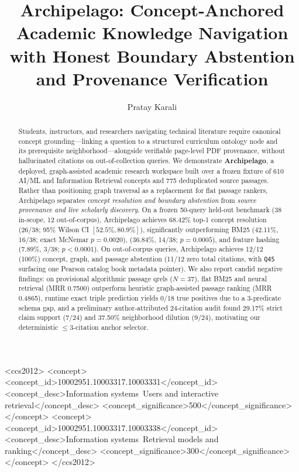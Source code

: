 \documentclass[sigconf]{acmart}
\begin{document}
\title{Archipelago: Concept-Anchored Academic Knowledge Navigation with Honest Boundary Abstention and Provenance Verification}

\author{Pratay Karali}

\begin{abstract}
Students, instructors, and researchers navigating technical literature require
canonical concept grounding---linking a question to a structured curriculum ontology
node and its prerequisite neighborhood---alongside verifiable page-level PDF
provenance, without hallucinated citations on out-of-collection queries. We
demonstrate \textbf{Archipelago}, a deployed, graph-assisted academic research
workspace built over a frozen fixture of 610 AI/ML and Information Retrieval concepts
and 775 deduplicated source passages. Rather than positioning graph traversal as a
replacement for flat passage rankers, Archipelago separates \emph{concept resolution
and boundary abstention} from \emph{source provenance and live scholarly discovery}.
On a frozen 50-query held-out benchmark (38 in-scope, 12 out-of-corpus), Archipelago
achieves 68.42\% top-1 concept resolution (26/38; 95\% Wilson CI $[52.5\%, 80.9\%]$),
significantly outperforming BM25 (42.11\%, 16/38; exact McNemar $p=0.0020$),
 (36.84\%, 14/38; $p=0.0005$), and feature hashing
(7.89\%, 3/38; $p<0.0001$). On out-of-corpus queries, Archipelago achieves 12/12
(100\%) concept, graph, and passage abstention (11/12 zero total citations, with
\texttt{Q45} surfacing one Pearson catalog book metadata pointer). We also report
candid negative findings: on provisional algorithmic passage qrels ($N=37$), flat
BM25 and neural retrieval (MRR 0.7500) outperform heuristic graph-assisted passage
ranking (MRR 0.4865), runtime exact triple prediction yields 0/18 true positives due
to a 3-predicate schema gap, and a preliminary author-attributed 24-citation audit
found 29.17\% strict claim support (7/24) and 37.50\% neighborhood dilution (9/24),
motivating our deterministic $\le 3$-citation anchor selector.
\end{abstract}

\begin{CCSXML}
<ccs2012>
 <concept>
  <concept_id>10002951.10003317.10003331</concept_id>
  <concept_desc>Information systems~Users and interactive retrieval</concept_desc>
  <concept_significance>500</concept_significance>
 </concept>
 <concept>
  <concept_id>10002951.10003317.10003338</concept_id>
  <concept_desc>Information systems~Retrieval models and ranking</concept_desc>
  <concept_significance>300</concept_significance>
 </concept>
</ccs2012>
\end{CCSXML}
\end{document}
